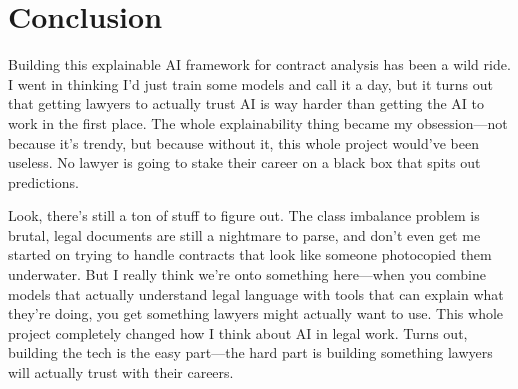 \section{Conclusion}
\label{sec:conclusion}

Building this explainable AI framework for contract analysis has been a wild ride. I went in thinking I'd just train some models and call it a day, but it turns out that getting lawyers to actually trust AI is way harder than getting the AI to work in the first place. The whole explainability thing became my obsession—not because it's trendy, but because without it, this whole project would've been useless. No lawyer is going to stake their career on a black box that spits out predictions.

Look, there's still a ton of stuff to figure out. The class imbalance problem is brutal, legal documents are still a nightmare to parse, and don't even get me started on trying to handle contracts that look like someone photocopied them underwater. But I really think we're onto something here—when you combine models that actually understand legal language with tools that can explain what they're doing, you get something lawyers might actually want to use. This whole project completely changed how I think about AI in legal work. Turns out, building the tech is the easy part—the hard part is building something lawyers will actually trust with their careers.